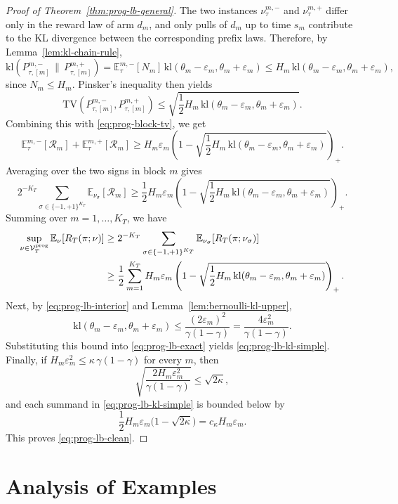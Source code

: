\documentclass[
  12pt]{article}
\begin{document}
\begin{proof}[Proof of Theorem~\ref{thm:prog-lb-general}]
The two instances $\nu_{\tau}^{m,-}$ and $\nu_{\tau}^{m,+}$ differ only in the
reward law of arm $d_m$, and only pulls of $d_m$ up to time $s_m$ contribute to
the KL divergence between the corresponding prefix laws. Therefore, by
Lemma~\ref{lem:kl-chain-rule},
\[
\mathrm{kl}(P_{\tau,[m]}^{m,-}\,\|\,P_{\tau,[m]}^{m,+})
=
\mathbb E_{\tau}^{m,-}[N_m]\,
\mathrm{kl}(\theta_m-\varepsilon_m,\theta_m+\varepsilon_m)
\le
H_m\,\mathrm{kl}(\theta_m-\varepsilon_m,\theta_m+\varepsilon_m),
\]
since $N_m\le H_m$.
Pinsker's inequality then yields
\[
\mathrm{TV}(P_{\tau,[m]}^{m,-},P_{\tau,[m]}^{m,+})
\le
\sqrt{
\frac12 H_m\,\mathrm{kl}(\theta_m-\varepsilon_m,\theta_m+\varepsilon_m)
}.
\]
Combining this with \eqref{eq:prog-block-tv}, we get
\[
\mathbb E_{\tau}^{m,-}[\mathcal R_m]
+
\mathbb E_{\tau}^{m,+}[\mathcal R_m]
\ge
H_m\varepsilon_m
\left(
1-
\sqrt{
\frac12 H_m\,\mathrm{kl}(\theta_m-\varepsilon_m,\theta_m+\varepsilon_m)
}
\right)_+ .
\]
Averaging over the two signs in block $m$ gives
\[
2^{-K_T}
\sum_{\sigma\in\{-1,+1\}^{K_T}}
\mathbb E_{\nu_\sigma}[\mathcal R_m]
\ge
\frac12
H_m\varepsilon_m
\left(
1-
\sqrt{
\frac12 H_m\,\mathrm{kl}(\theta_m-\varepsilon_m,\theta_m+\varepsilon_m)
}
\right)_+ .
\]
Summing over $m=1,\dots,K_T$, we have 
\begin{align}
\sup_{\nu\in\mathcal V_T^{\mathrm{prog}}}
\mathbb E_\nu[R_T(\pi;\nu)]
&\ge
2^{-K_T}
\sum_{\sigma\in\{-1,+1\}^{K_T}}
\mathbb E_{\nu_\sigma}[R_T(\pi;\nu_\sigma)]
\notag\\
&\ge
\frac12
\sum_{m=1}^{K_T}
H_m\varepsilon_m
\left(
1-
\sqrt{
\frac12 H_m\,
\mathrm{kl}(\theta_m-\varepsilon_m,\theta_m+\varepsilon_m)
}
\right)_+ .
\label{eq:prog-lb-exact}
\end{align}
 Next, by \eqref{eq:prog-lb-interior} and Lemma~\ref{lem:bernoulli-kl-upper},
\[
\mathrm{kl}(\theta_m-\varepsilon_m,\theta_m+\varepsilon_m)
\le
\frac{(2\varepsilon_m)^2}{\gamma(1-\gamma)}
=
\frac{4\varepsilon_m^2}{\gamma(1-\gamma)}.
\]
Substituting this bound into \eqref{eq:prog-lb-exact} yields
\eqref{eq:prog-lb-kl-simple}. Finally, if
\(
H_m\varepsilon_m^2\le \kappa\,\gamma(1-\gamma)
\)
for every $m$, then
\[
\sqrt{
\frac{2H_m\varepsilon_m^2}{\gamma(1-\gamma)}
}
\le
\sqrt{2\kappa},
\]
and each summand in \eqref{eq:prog-lb-kl-simple} is bounded below by
\[
\frac12 H_m\varepsilon_m\bigl(1-\sqrt{2\kappa}\bigr)
=
c_\kappa H_m\varepsilon_m.
\]
This proves \eqref{eq:prog-lb-clean}.
\end{proof}

\section{Analysis of Examples}
\end{document}
